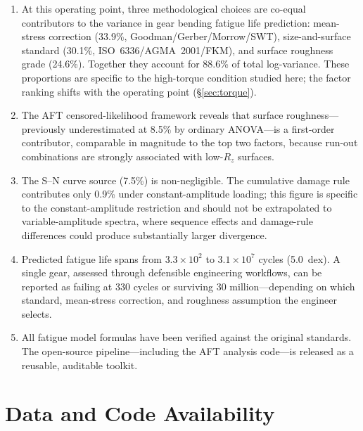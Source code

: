 \documentclass[12pt,a4paper]{article}
\begin{document}
\begin{enumerate}
  \item At this operating point, three methodological choices are co-equal
        contributors to the variance in gear bending fatigue life
        prediction: mean-stress correction (33.9\%,
        Goodman/Gerber/Morrow/SWT), size-and-surface standard (30.1\%,
        ISO~6336/AGMA~2001/FKM), and surface roughness grade (24.6\%).
        Together they account for 88.6\% of total log-variance. These
        proportions are specific to the high-torque condition studied here;
        the factor ranking shifts with the operating point
        (\S\ref{sec:torque}).
  \item The AFT censored-likelihood framework reveals that surface
        roughness---previously underestimated at 8.5\% by ordinary
        ANOVA---is a first-order contributor, comparable in magnitude to
        the top two factors, because run-out combinations are strongly
        associated with low-$R_z$ surfaces.
  \item The S--N curve source (7.5\%) is non-negligible. The cumulative
        damage rule contributes only 0.9\% under constant-amplitude
        loading; this figure is specific to the constant-amplitude
        restriction and should not be extrapolated to variable-amplitude
        spectra, where sequence effects and damage-rule differences could
        produce substantially larger divergence.
  \item Predicted fatigue life spans from $3.3\times10^2$ to
        $3.1\times10^7$ cycles (5.0~dex). A single gear, assessed
        through defensible engineering workflows, can be reported as
        failing at 330 cycles or surviving 30 million---depending on
        which standard, mean-stress correction, and roughness
        assumption the engineer selects.
  \item All fatigue model formulas have been verified against the
        original standards. The open-source pipeline---including
        the AFT analysis code---is released as a reusable, auditable
        toolkit.
\end{enumerate}

\section*{Data and Code Availability}
\end{document}
